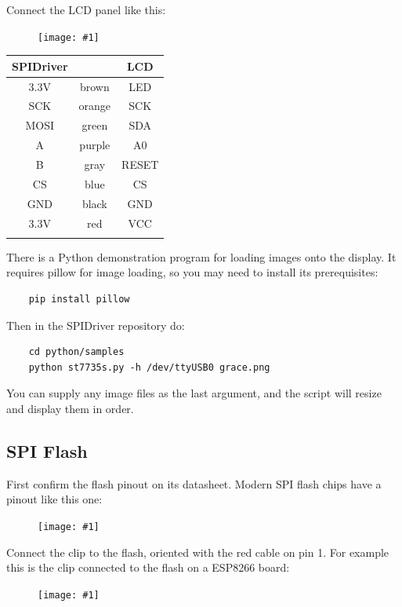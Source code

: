 \documentclass{article}
\newcommand{\png}[1]{
\begin{figure}[H]
\begin{center}
\texttt{[image: \#1]}
\end{center}
\end{figure}
}
\newcommand{\pngw}[2]{
\begin{figure}[H]
\begin{center}
\texttt{[image: \#1]}
\end{center}
\end{figure}
}
\newcommand{\gap}{\vspace{10pt}}
\begin{document}
Connect the LCD panel like this:

\pngw{img/spidriver/spidriver-lcd-1}{0.5}

\begin{center}
\gap\begin{tabular}{ccc}
\hline
SPIDriver&        & LCD     \\
\hline
3.3V     & brown  & LED     \\
SCK      & orange & SCK     \\
MOSI     & green  & SDA     \\
A        & purple & A0      \\
B        & gray   & RESET   \\
CS       & blue   & CS      \\
GND      & black  & GND     \\
3.3V     & red    & VCC     \\
\hline \\
\end{tabular}
\end{center}


There is a Python demonstration program for loading images onto the display.
It requires pillow for image loading, so you may need to install its prerequisites:

\begin{lstlisting}
    pip install pillow
\end{lstlisting}

Then in the SPIDriver repository do:

\begin{lstlisting}
    cd python/samples
    python st7735s.py -h /dev/ttyUSB0 grace.png
\end{lstlisting}

You can supply any image files as the last argument,
and the script will resize and display them in order.

\subsection{SPI Flash}

First confirm the flash pinout on its datasheet. Modern SPI flash chips have a pinout like this one:

\png{img/spidriver/spidriver-flash-0}

Connect the clip to the flash, oriented with the red cable on pin 1.
For example this is the clip connected to the flash on a ESP8266 board:

\png{img/spidriver/spidriver-esp1}
 
\end{document}
